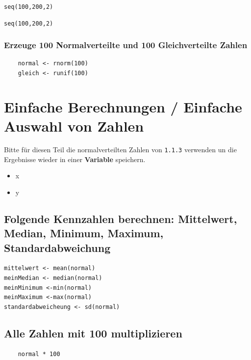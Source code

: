\documentclass{article}
\begin{document}
 \begin{lstlisting}
seq(100,200,2)
 \end{lstlisting}
 
 \begin{verbatim}
seq(100,200,2)
 \end{verbatim}
 
 \subsubsection{Erzeuge 100 Normalverteilte und 100 Gleichverteilte Zahlen}
 
 \begin{lstlisting}
 	normal <- rnorm(100)
 	gleich <- runif(100)
 \end{lstlisting}
 





\section{Einfache Berechnungen / Einfache Auswahl von Zahlen}

Bitte für diesen Teil die normalverteilten Zahlen von \texttt{1.1.3} verwenden un die Ergebnisse wieder in einer \textbf{Variable} speichern.

\begin{itemize}
	\item x
	\item y
\end{itemize}

\subsection{Folgende Kennzahlen berechnen: Mittelwert, Median, Minimum, Maximum, Standardabweichung}

\begin{lstlisting}
mittelwert <- mean(normal)
meinMedian <- median(normal)
meinMinimum <-min(normal)
meinMaximum <-max(normal)
standardabweicheung <- sd(normal)
\end{lstlisting}

\subsection{Alle Zahlen mit 100 multiplizieren}
\begin{lstlisting}
	normal * 100
\end{lstlisting}
\end{document}
